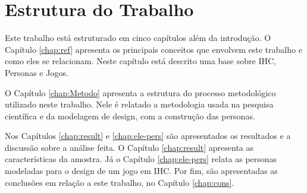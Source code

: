 \section{Estrutura do Trabalho}

Este trabalho está estruturado em cinco capítulos além da introdução. O Capítulo \ref{chap:ref} apresenta os principais conceitos que envolvem este trabalho e como eles se relacionam. Neste capítulo está descrito uma base sobre IHC, Personas e Jogos.

O Capítulo \ref{chap:Metodo} apresenta a estrutura do processo metodológico utilizado neste trabalho. Nele é relatado a metodologia usada na pesquisa científica e da modelagem de design, com a construção das personas. 

Nos Capítulos \ref{chap:result} e \ref{chap:ele-pers} são apresentados os resultados e a discussão sobre a análise feita. O Capítulo \ref{chap:result} apresenta as características da amostra. Já o Capítulo \ref{chap:ele-pers} relata as personas modeladas para o design de um jogo em IHC. Por fim, são apresentadas as conclusões em relação a este trabalho, no Capítulo \ref{chap:cons}. 
